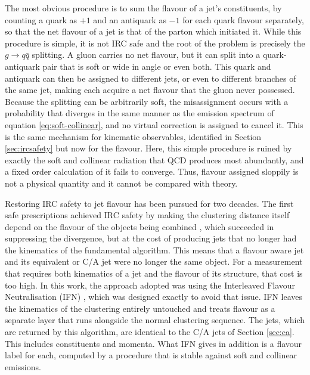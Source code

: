 The most obvious procedure is to sum the flavour of a jet's constituents, by counting
a quark as $+1$ and an antiquark as $-1$ for each quark flavour separately, so
that the net flavour of a jet is that of the parton which initiated it. While
this procedure is simple, it is not IRC safe and the root of the problem is precisely the
$g \to q\bar{q}$ splitting. A gluon carries no net flavour, but it can split into
a quark-antiquark pair that is soft or wide in angle or even both. This quark and 
antiquark can then be assigned to different jets, or even to different branches of
the same jet, making each acquire a net flavour that the gluon never possessed.
Because the splitting can be arbitrarily soft, 
the misassignment occurs with a probability that diverges in the same manner as the
emission spectrum of equation \eqref{eq:soft-collinear}, and no virtual correction
is assigned to cancel it. This is the same mechanism for kinematic observables,
identified in Section \ref{sec:ircsafety} but now for the flavour. Here, this
simple procedure is ruined by exactly the soft and collinear radiation that 
QCD produces most abundantly, and a fixed order calculation of it fails to converge.
Thus, flavour assigned sloppily is not a physical quantity and it cannot be compared with theory.

Restoring IRC safety to jet flavour has been pursued for two decades.
The first safe prescriptions achieved IRC safety by making the clustering
distance itself depend on the flavour of the objects being combined \cite{Banfi_2006},
which succeeded in suppressing the divergence, but at the cost of producing jets 
that no longer had the kinematics of the fundamental algorithm. This means that a flavour
aware jet and its equivalent \antikt{} or C/A jet were no longer the same object.
For a measurement that requires both kinematics of a jet and the flavour of its structure,
that cost is too high. In this work, the approach adopted was using the Interleaved Flavour Neutralisation (IFN)
\cite{caola2023flavouredjetsexactantikt}, which was designed exactly to avoid that issue.
IFN leaves the kinematics of the clustering entirely untouched and treats flavour as
a separate layer that runs alongside the normal clustering sequence. The jets, which are returned
by this algorithm, are identical to the C/A jets of Section \ref{sec:ca}. This includes 
constituents and momenta. What IFN gives in addition is a flavour label for each, computed by
a procedure that is stable against soft and collinear emissions.

